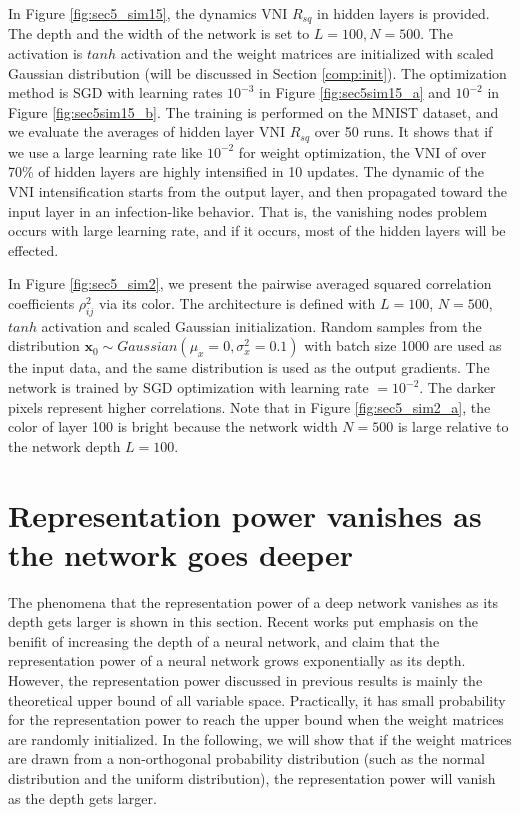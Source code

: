 In Figure \ref{fig:sec5_sim15}, the dynamics VNI $R_{sq}$ in hidden layers is provided.
The depth and the width of the network is set to $L=100, N=500$.
The activation is $tanh$ activation and the weight matrices are initialized with scaled Gaussian
distribution (will be discussed in Section \ref{comp:init}).
The optimization method is SGD with learning rates $10^{-3}$ in Figure \ref{fig:sec5sim15_a} and
$10^{-2}$ in Figure \ref{fig:sec5sim15_b}.
The training is performed on the MNIST dataset, and we evaluate the averages of hidden layer
VNI $R_{sq}$ over 50 runs.
It shows that if we use a large learning rate like $10^{-2}$ for weight optimization, the VNI of
over 70\% of hidden layers are highly intensified in 10 updates.
The dynamic of the VNI intensification starts from the output layer, and then propagated toward the
input layer in an infection-like behavior. 
That is, the vanishing nodes problem occurs with large learning rate, and if it occurs, most of the
hidden layers will be effected.

In Figure \ref{fig:sec5_sim2}, we present the pairwise averaged squared correlation coefficients
$\rho_{ij}^2$ via its color.
The architecture is defined with $L=100$, $N=500$, $tanh$ activation and scaled Gaussian initialization.
Random samples from the distribution $\mathbf{x}_0\sim Gaussian(\mu_x=0, \sigma^2_x=0.1)$
with batch size 1000 are used as the input data, and the same distribution is used as the output gradients. 
The network is trained by SGD optimization with learning rate $=10^{-2}$.
The darker pixels represent higher correlations.
Note that in Figure \ref{fig:sec5_sim2_a}, the color of layer 100 is bright because the network width
$N=500$ is large relative to the network depth $L=100$.









\section{Representation power vanishes as the network goes deeper} \label{repr_general}

The phenomena that the representation power of a deep network vanishes as its depth gets larger is shown
in this section.
Recent works \cite{mft:expo, expressive, linear_regions, expr_power, relu_understand,
relu_benifit, relu_approx} put emphasis on the benifit of increasing the depth of a neural network,
and claim that the representation power of a neural network grows exponentially as its depth. 
However, the representation power discussed in previous results is mainly the theoretical upper bound of
all variable space.
Practically, it has small probability for the representation power to reach the upper bound when
the weight matrices are randomly initialized.
In the following, we will show that if the weight matrices are drawn from a non-orthogonal
probability distribution (such as the normal distribution and the uniform distribution), the
representation power will vanish as the depth gets larger.

